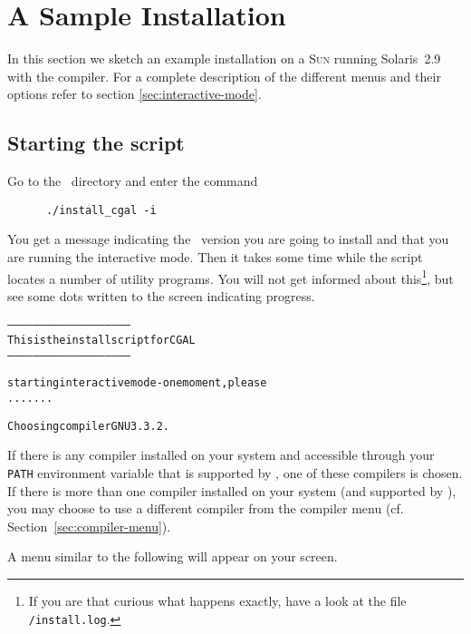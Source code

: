 \section{A Sample Installation}\label{sec:sample-inst}

In this section we sketch an example installation on a \textsc{Sun}
running Solaris~2.9 with the  compiler. For a complete
description of the different menus and their options refer to section
\ref{sec:interactive-mode}.

\subsection{Starting the script}

Go to the \cgaldir\ directory and enter the command
\begin{verbatim}
      ./install_cgal -i
\end{verbatim}

You get a message indicating the \cgal\ version you are going to
install and that you are running the interactive mode. Then it takes
some time while the script locates a number of utility programs. You
will not get informed about this\footnote{If you are that curious what
  happens exactly, have a look at the file
  \texttt{\cgaldir/install.log}.}, but see some
dots written to the screen indicating progress.

{\ccTexHtml{\scriptsize}{}
\begin{alltt}
--------------------------------------------------------
  This is the install script for CGAL \cgalrelease
--------------------------------------------------------

starting interactive mode - one moment, please
.......

  Choosing compiler GNU 3.3.2.

\end{alltt}}
  
If there is any compiler installed on your system and accessible
through your \texttt{PATH} environment variable that is supported by
\cgal, one of these compilers is chosen. If there is more than one
compiler installed on your system (and supported by \cgal), you may
choose to use a different compiler from the compiler menu (cf.
Section~\ref{sec:compiler-menu}).

A menu similar to the following will appear on your screen.


